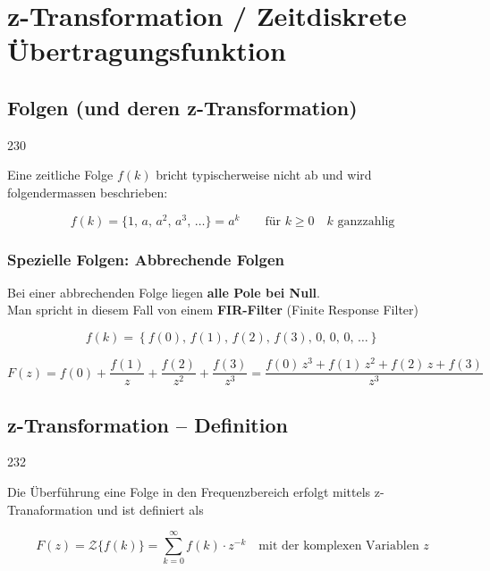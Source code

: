 
\section{z-Transformation / Zeitdiskrete Übertragungsfunktion}

\subsection{Folgen (und deren z-Transformation)}{230}

Eine zeitliche Folge $f(k)$ bricht typischerweise nicht ab und wird folgendermassen beschrieben:

\vspace{-0.2cm}

$$ f(k) = \{1, \, a, \, a^2, \, a^3, \, \ldots \} = a^k \qquad \text{für } k \geq 0 \quad k \text{ ganzzahlig} $$


\subsubsection{Spezielle Folgen: Abbrechende Folgen}

Bei einer abbrechenden Folge liegen \textbf{alle Pole bei Null}. \\
Man spricht in diesem Fall von einem \textbf{FIR-Filter} (Finite Response Filter)



\vspace{-0.2cm}

$$ f(k) = \left\{ f(0), \, f(1), \, f(2), \, f(3), \, 0, \, 0, \, 0, \, \ldots  \right\} $$

\vspace{-0.2cm}

$$ F(z) = f(0) + \frac{f(1)}{z} + \frac{f(2)}{z^2} + \frac{f(3)}{z^3} = \frac{f(0) \, z^3 + f(1) \, z^2 + f(2) \, z + f(3)}{z^3}$$



\subsection{z-Transformation -- Definition}{232}

Die Überführung eine Folge in den Frequenzbereich erfolgt mittels z-Tranaformation und ist definiert als

\vspace{-0.2cm}

$$ \boxed{ F(z) = \mathcal{Z}\{f(k)\} = \sum\limits_{k=0}^{\infty} f(k) \cdot z^{-k} \quad \text{mit der komplexen Variablen } z } $$


